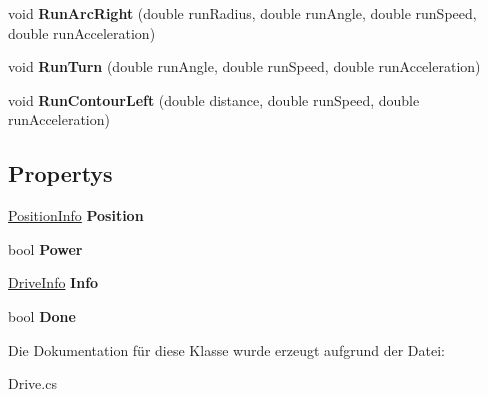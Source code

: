 \begin{DoxyCompactItemize}
\item 
\hypertarget{class_robot_ctrl_1_1_drive_a6ef57fad047014b11a60f76c74a4b74c}{
void {\bfseries RunArcRight} (double runRadius, double runAngle, double runSpeed, double runAcceleration)}
\label{class_robot_ctrl_1_1_drive_a6ef57fad047014b11a60f76c74a4b74c}

\item 
\hypertarget{class_robot_ctrl_1_1_drive_a2c49e16e45f1db8c54160cd978d501ea}{
void {\bfseries RunTurn} (double runAngle, double runSpeed, double runAcceleration)}
\label{class_robot_ctrl_1_1_drive_a2c49e16e45f1db8c54160cd978d501ea}

\item 
\hypertarget{class_robot_ctrl_1_1_drive_ab83216b1690ed4b93b412984318ad345}{
void {\bfseries RunContourLeft} (double distance, double runSpeed, double runAcceleration)}
\label{class_robot_ctrl_1_1_drive_ab83216b1690ed4b93b412984318ad345}

\end{DoxyCompactItemize}
\subsection*{Propertys}
\begin{DoxyCompactItemize}
\item 
\hypertarget{class_robot_ctrl_1_1_drive_a422e46eec9edf940ccd3afc5f4fde11e}{
\hyperlink{struct_robot_ctrl_1_1_position_info}{PositionInfo} {\bfseries Position}}
\label{class_robot_ctrl_1_1_drive_a422e46eec9edf940ccd3afc5f4fde11e}

\item 
\hypertarget{class_robot_ctrl_1_1_drive_a208251b538e017abf712b1881a32239a}{
bool {\bfseries Power}}
\label{class_robot_ctrl_1_1_drive_a208251b538e017abf712b1881a32239a}

\item 
\hypertarget{class_robot_ctrl_1_1_drive_a0e6f8392e835c0789ce8cc9ce1a91ed2}{
\hyperlink{struct_robot_ctrl_1_1_drive_info}{DriveInfo} {\bfseries Info}}
\label{class_robot_ctrl_1_1_drive_a0e6f8392e835c0789ce8cc9ce1a91ed2}

\item 
\hypertarget{class_robot_ctrl_1_1_drive_a5c86389ee2d397c20edf926a21326399}{
bool {\bfseries Done}}
\label{class_robot_ctrl_1_1_drive_a5c86389ee2d397c20edf926a21326399}

\end{DoxyCompactItemize}


Die Dokumentation für diese Klasse wurde erzeugt aufgrund der Datei:\begin{DoxyCompactItemize}
\item 
Drive.cs\end{DoxyCompactItemize}
